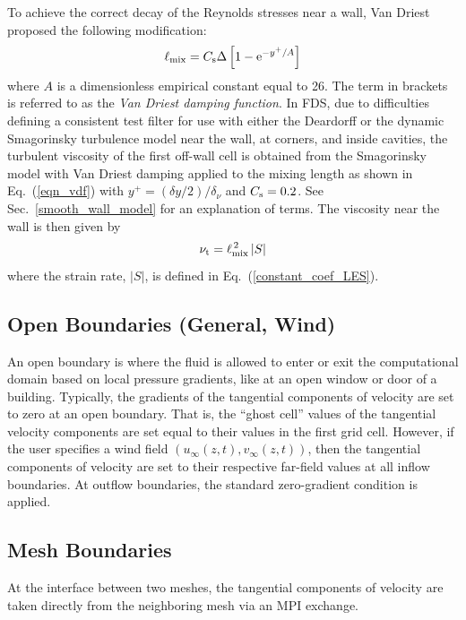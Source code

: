 To achieve the correct decay of the Reynolds stresses near a wall, Van Driest~\cite{Wilcox:1} proposed the following modification:
\begin{equation}
\label{eqn_vdf}
\ell_{\rm mix} = C_{\rm s} \Delta \left[ 1 - \mathrm{e}^{-y^+/A} \right]
\end{equation}
where $A$ is a dimensionless empirical constant equal to 26.  The term in brackets is referred to as the {\em Van Driest damping function}. In FDS, due to difficulties defining a consistent test filter for use with either the Deardorff or the dynamic Smagorinsky turbulence model near the wall, at corners, and inside cavities, the turbulent viscosity of the first off-wall cell is obtained from the Smagorinsky model with Van Driest damping applied to the mixing length as shown in Eq.~(\ref{eqn_vdf}) with $y^+ = (\delta y/2)/\delta_\nu$ and $C_{\rm s} = 0.2$.  See Sec.~\ref{smooth_wall_model} for an explanation of terms. The viscosity near the wall is then given by
\begin{equation}
   \nu_{\rm t} = \ell_{\rm mix}^{\,2}\,|S|  \label{eqn_nearwall_viscosity}
\end{equation}
where the strain rate, $|S|$, is defined in Eq.~(\ref{constant_coef_LES}).

\subsection{Open Boundaries (General, Wind)}
\label{sec:opentang}

An open boundary is where the fluid is allowed to enter or exit the computational domain based on local pressure gradients, like at an open window or door of a building. Typically, the gradients of the tangential components of velocity are set to zero at an open boundary. That is, the ``ghost cell'' values of the tangential velocity components are set equal to their values in the first grid cell. However, if the user specifies a wind field $(u_\infty(z,t),v_\infty(z,t))$, then the tangential components of velocity are set to their respective far-field values at all inflow boundaries. At outflow boundaries, the standard zero-gradient condition is applied.

\subsection{Mesh Boundaries}

At the interface between two meshes, the tangential components of velocity are taken directly from the neighboring mesh via an MPI exchange.




